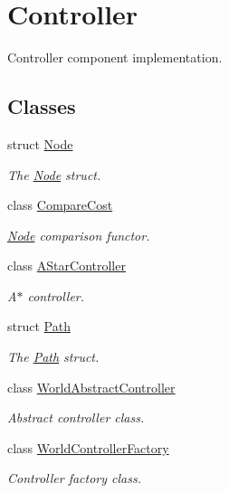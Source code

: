 \hypertarget{group__controller}{}\section{Controller}
\label{group__controller}


Controller component implementation.  


\subsection*{Classes}
\begin{DoxyCompactItemize}
\item 
struct \hyperlink{structNode}{Node}
\begin{DoxyCompactList}\small\item\em The \hyperlink{structNode}{Node} struct. \end{DoxyCompactList}\item 
class \hyperlink{classCompareCost}{Compare\+Cost}
\begin{DoxyCompactList}\small\item\em \hyperlink{structNode}{Node} comparison functor. \end{DoxyCompactList}\item 
class \hyperlink{classAStarController}{A\+Star\+Controller}
\begin{DoxyCompactList}\small\item\em A$\ast$ controller. \end{DoxyCompactList}\item 
struct \hyperlink{structPath}{Path}
\begin{DoxyCompactList}\small\item\em The \hyperlink{structPath}{Path} struct. \end{DoxyCompactList}\item 
class \hyperlink{classWorldAbstractController}{World\+Abstract\+Controller}
\begin{DoxyCompactList}\small\item\em Abstract controller class. \end{DoxyCompactList}\item 
class \hyperlink{classWorldControllerFactory}{World\+Controller\+Factory}
\begin{DoxyCompactList}\small\item\em Controller factory class. \end{DoxyCompactList}\end{DoxyCompactItemize}
